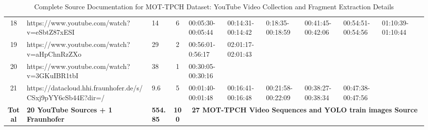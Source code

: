 \begin{landscape}
\begin{table}[!ht]
{\begin{tabular}{|c|p{11cm}|p{1.4cm}|c|p{3.1cm}|p{3.0cm}|p{3.5cm}|p{3.1cm}|p{3.1cm}|p{3.1cm}|p{3.1cm}|}
        \rowcolor{gray!10}
        18 & https://www.youtube.com/watch?v=eSbtZ87xESI & 14 & 6 & 00:05:30-00:05:44 & 00:14:31-00:14:42 & 0:18:35-00:18:59 & 00:41:45-00:42:06 & 00:54:51-00:54:56 & 01:10:39-01:10:44 &   \\ 
        19 & https://www.youtube.com/watch?v=aHpChnRzZXo & 29 & 2 & 00:56:01-0:56:17 & 02:01:17-02:01:43 & ~ & ~ & ~ & ~ &   \\ 
        \rowcolor{gray!10}
        20 & https://www.youtube.com/watch?v=3GKuIBR1tbI & 38 & 1 & 00:30:05-00:30:16 & ~ & ~ & ~ & ~ & ~ &   \\ 
        21 & https://datacloud.hhi.fraunhofer.de/s/CSxj9pYY6cSb44E?dir=/ & 9.6 & 5 & 00:01:40-00:01:48 & 00:16:41-00:16:48 & 00:21:58-00:22:09 & 00:38:27-00:38:34 & 00:47:38-00:47:56 & ~ &   \\ 
        \rowcolor{gray!20}
        \textbf{Total} & \textbf{20 YouTube Sources + 1 Fraunhofer} & \textbf{554.85} & \textbf{100} & \multicolumn{7}{c|}{\textbf{27 MOT-TPCH Video Sequences and YOLO train images Source}} \\ \hline
    \end{tabular}%
    }
    \caption{Complete Source Documentation for MOT-TPCH Dataset: YouTube Video Collection and Fragment Extraction Details}
    \label{tab:video-source-appendix}
\end{table}
\end{landscape}